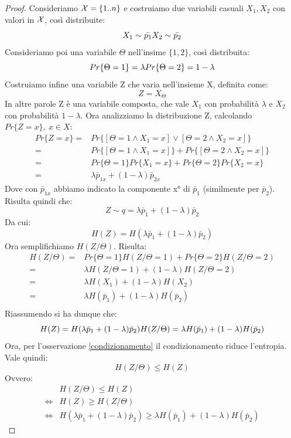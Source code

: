 \begin{osservazione}
\begin{proof}
 Consideriamo $\mathcal{X}=\{1..n\}$ e costruiamo due variabili casuali $X_1,X_2$ con valori in $\mathcal{X}$, così distribuite:
 \[
  X_1 \sim \bar{p_1} \\ X_2 \sim \bar{p_2}
 \]
 Consideriamo poi una variabile $\Theta$ nell'insime $\{1,2\}$, così distribuita:
 \[
  Pr\{\Theta=1\}=\lambda \\ Pr\{\Theta=2\}=1-\lambda
 \]
 Costruiamo infine una variabile Z che varia nell'insieme X, definita come:
 \[
  Z=X_{\Theta}
 \]
 In altre parole Z è una variabile composta, che vale $X_1$ con probabilità $\lambda$ e $X_2$ con probabilità $1-\lambda$.
 Ora analizziamo la distribuzione Z, calcolando $Pr\{Z=x\} , \ x \in X$:
 \[\begin{split}
  Pr\{Z=x\}=&Pr\{[\Theta=1 \land X_1=x] \lor [\Theta=2 \land X_2=x]  \} \\
  =&Pr\{[\Theta=1 \land X_1=x]\} + Pr\{[\Theta=2 \land X_2=x]  \} \\
  =&Pr\{\Theta=1\} Pr\{X_1=x\} + Pr\{\Theta=2\} Pr\{X_2=x\} \\
  =& \lambda \bar{p}_{1x} + (1-\lambda) \bar{p}_{2x}
  \end{split}
 \]
  Dove con $\bar{p}_{1x}$ abbiamo indicato la componente x° di $\bar{p}_1$ (similmente per $\bar{p}_2$).
  Risulta quindi che:
  \[
   Z \sim q=\lambda \bar{p}_1 + (1-\lambda) \bar{p}_2
  \]
  Da cui:
  \[
   H(Z)=H(\lambda \bar{p}_1 + (1-\lambda) \bar{p}_2)
  \]
  Ora semplifichiamo $H(Z/\Theta)$. Risulta:
  \[\begin{split}
   H(Z/\Theta)=&Pr\{\Theta=1\}H(Z/\Theta=1)+Pr\{\Theta=2\}H(Z/\Theta=2) \\
   =& \lambda H(Z/\Theta=1)+(1-\lambda)H(Z/\Theta=2) \\
   =& \lambda H(X_1)+(1-\lambda)H(X_2) \\
   =& \lambda H(\bar{p}_1)+(1-\lambda)H(\bar{p}_2) \\
   \end{split}
  \]
  Riassumendo si ha dunque che:
  \[
    H(Z)=H(\lambda \bar{p}_1 + (1-\lambda) \bar{p}_2) \\ H(Z/\Theta)=\lambda H(\bar{p}_1)+(1-\lambda)H(\bar{p}_2)
  \]
  Ora, per l'osservazione \ref{condizionamento} il condizionamento riduce l'entropia. Vale quindi:
   \[
     H(Z/\Theta) \le H(Z) 
  \]
  Ovvero:
  \[\begin{split}
   & H(Z/\Theta) \le H(Z) \\
   \iff & H(Z) \ge H(Z/\Theta)  \\
   \iff &  H(\lambda \bar{p}_1 + (1-\lambda) \bar{p}_2) \ge \lambda H(\bar{p}_1)+(1-\lambda)H(\bar{p}_2)
   \end{split}
  \]


\end{proof}
\label{entrconcava}
\end{osservazione}

